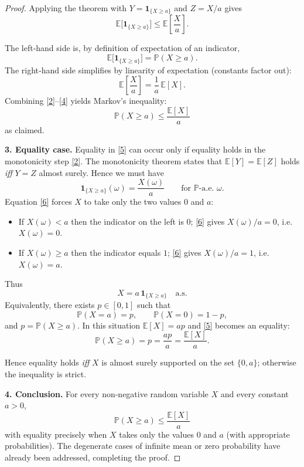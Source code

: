 \begin{proof}
Applying the theorem with \(Y=\mathbf 1_{\{X\ge a\}}\) and \(Z=X/a\) gives
\begin{equation}
\mathbb{E}\!\bigl[\mathbf 1_{\{X\ge a\}}\bigr]\le
\mathbb{E}\!\left[\frac{X}{a}\right].
\tag{2}
\end{equation}

The left‑hand side is, by definition of expectation of an indicator,
\begin{equation}
\mathbb{E}\!\bigl[\mathbf 1_{\{X\ge a\}}\bigr]=\mathbb{P}(X\ge a).
\tag{3}
\end{equation}
The right‑hand side simplifies by linearity of expectation (constants factor out):
\begin{equation}
\mathbb{E}\!\left[\frac{X}{a}\right]=\frac{1}{a}\,\mathbb{E}[X].
\tag{4}
\end{equation}
Combining \eqref{2}–\eqref{4} yields Markov’s inequality:
\begin{equation}
\boxed{\;\mathbb{P}(X\ge a)\le\frac{\mathbb{E}[X]}{a}\;}
\tag{5}
\end{equation}
as claimed.

\medskip
\textbf{3. Equality case.}  
Equality in \eqref{5} can occur only if equality holds in the monotonicity step \eqref{2}.  The monotonicity theorem states that \(\mathbb{E}[Y]=\mathbb{E}[Z]\) holds \emph{iff} \(Y=Z\) almost surely.  Hence we must have
\begin{equation}
\mathbf 1_{\{X\ge a\}}(\omega)=\frac{X(\omega)}{a}
\qquad\text{for }\mathbb{P}\text{-a.e. }\omega.
\tag{6}
\end{equation}
Equation \eqref{6} forces \(X\) to take only the two values \(0\) and \(a\):
\begin{itemize}
\item If \(X(\omega)<a\) then the indicator on the left is \(0\); \eqref{6} gives \(X(\omega)/a=0\), i.e. \(X(\omega)=0\).
\item If \(X(\omega)\ge a\) then the indicator equals \(1\); \eqref{6} gives \(X(\omega)/a=1\), i.e. \(X(\omega)=a\).
\end{itemize}
Thus
\[
X = a\,\mathbf 1_{\{X\ge a\}}\quad\text{a.s.}
\]
Equivalently, there exists \(p\in[0,1]\) such that
\[
\mathbb{P}(X=a)=p,\qquad \mathbb{P}(X=0)=1-p,
\]
and \(p=\mathbb{P}(X\ge a)\).  In this situation \(\mathbb{E}[X]=ap\) and \eqref{5} becomes an equality:
\[
\mathbb{P}(X\ge a)=p=\frac{ap}{a}=\frac{\mathbb{E}[X]}{a}.
\]

Hence equality holds \emph{iff} \(X\) is almost surely supported on the set \(\{0,a\}\); otherwise the inequality is strict.

\medskip
\textbf{4. Conclusion.}  
For every non‑negative random variable \(X\) and every constant \(a>0\),
\[
\boxed{\;\mathbb{P}(X\ge a)\le\frac{\mathbb{E}[X]}{a}\;}
\]
with equality precisely when \(X\) takes only the values \(0\) and \(a\) (with appropriate probabilities).  The degenerate cases of infinite mean or zero probability have already been addressed, completing the proof.
\end{proof}